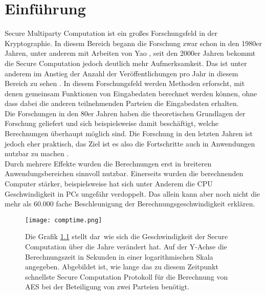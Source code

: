 \chapter{Einführung}
Secure Multiparty Computation ist ein großes Forschungsfeld in der Kryptographie. In diesem Bereich begann die Forschung zwar schon in den 1980er Jahren, unter anderem mit Arbeiten von Yao \cite{Yao1982}, seit den 2000er Jahren bekommt die Secure Computation jedoch deutlich mehr Aufmerksamkeit. Das ist unter anderem im Anstieg der Anzahl der Veröffentlichungen pro Jahr in diesem Bereich zu sehen \cite{Kogan2021}. 
In diesem Forschungsfeld werden Methoden erforscht, mit denen gemeinsam Funktionen von Eingabedaten berechnet werden können, ohne dass dabei die anderen teilnehmenden Parteien die Eingabedaten erhalten.\\
Die Forschungen in den 80er Jahren haben die theoretischen Grundlagen der Forschung geliefert und sich beispielsweise damit beschäftigt, welche Berechnungen überhaupt möglich sind. Die Forschung in den letzten Jahren ist jedoch eher praktisch, das Ziel ist es also die Fortschritte auch in Anwendungen nutzbar zu machen \cite{Kogan2021}.\\
Durch mehrere Effekte wurden die Berechnungen erst in breiteren Anwendungsbereichen sinnvoll nutzbar. Einerseits wurden die berechnenden Computer stärker, beispielsweise hat sich unter Anderem die CPU Geschwindigkeit in PCs ungefähr verdoppelt. Das allein kann aber noch nicht die mehr als 60.000 fache Beschleunigung der Berechnungsgeschwindigkeit \cite{Kogan2021} erklären. 
\begin{figure}[H]
\begin{center}
\texttt{[image: comptime.png]}
\caption{
Die Grafik \ref{evolution_of_computation} stellt dar\, wie sich die Geschwindigkeit der Secure Computation über die Jahre verändert hat.
Auf der Y-Achse die Berechnungszeit in Sekunden in einer logarithmischen Skala angegeben. Abgebildet ist, wie lange das zu diesem Zeitpunkt schnellste Secure Computation Protokoll für die Berechnung von AES bei der Beteiligung von zwei Parteien benötigt.\\
}
\cite{Kogan2021}
\label{evolution_of_computation}
\end{center}

\end{figure}

